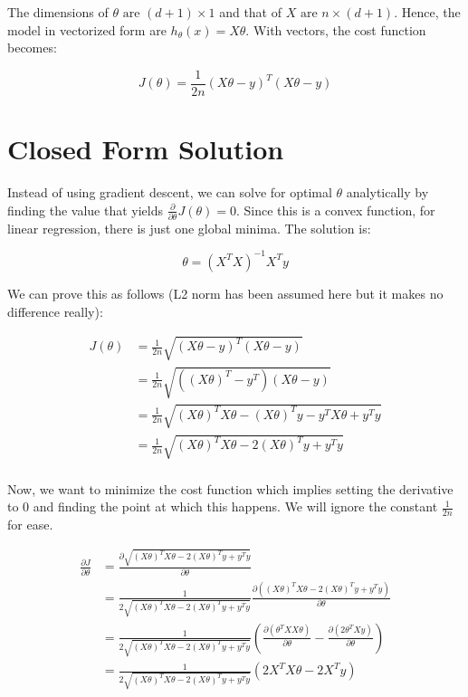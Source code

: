 The dimensions of $\theta \text{ are } (d+1) \times 1$ and that of $X \text{ are } n \times (d+1)$. Hence, the model in vectorized form are $h_{\theta}(x) = X\theta$. With vectors, the cost function becomes: 

\begin{equation}
    J(\theta) = \frac{1}{2n} (X\theta - y)^T(X\theta -y)
\end{equation}

\section{Closed Form Solution}

Instead of using gradient descent, we can solve for optimal $\theta$ analytically by finding the value that yields $\frac{\partial}{\partial\theta}J(\theta) = 0$. Since this is a convex function, for linear regression, there is just one global minima. The solution is:

\begin{equation}
    \theta = (X^T X)^{-1} X^T y
\end{equation}

We can prove this as follows (L2 norm has been assumed here but it makes no difference really):

\begin{equation*}
\begin{split}
    J(\theta) &= \frac{1}{2n} \sqrt{(X\theta - y)^T(X\theta -y)} \\
    &= \frac{1}{2n} \sqrt{((X\theta)^T - y^T)(X\theta-y)} \\
    &= \frac{1}{2n} \sqrt{(X\theta)^TX\theta - (X\theta)^Ty - y^TX\theta + y^Ty} \\
    &= \frac{1}{2n} \sqrt{(X\theta)^TX\theta - 2(X\theta)^Ty + y^Ty} \\
\end{split}
\end{equation*}

Now, we want to minimize the cost function which implies setting the derivative to 0 and finding the point at which this happens. We will ignore the constant $\frac{1}{2n}$ for ease. 

\begin{equation*}
\begin{split}
    \frac{\partial J}{\partial \theta} &= \frac{\partial \sqrt{(X\theta)^TX\theta - 2(X\theta)^Ty + y^Ty}}{\partial \theta} \\
    &= \frac{1}{2\sqrt{(X\theta)^TX\theta - 2(X\theta)^Ty + y^Ty}} \frac{\partial ((X\theta)^TX\theta - 2(X\theta)^Ty + y^Ty)}{\partial \theta} \\
    &= \frac{1}{2\sqrt{(X\theta)^TX\theta - 2(X\theta)^Ty + y^Ty}} (\frac{\partial(\theta^TXX\theta)}{\partial \theta} - \frac{\partial(2\theta^TXy)}{\partial \theta}) \\
    &= \frac{1}{2\sqrt{(X\theta)^TX\theta - 2(X\theta)^Ty + y^Ty}} (2X^TX\theta - 2X^Ty) \\
\end{split}
\end{equation*}

